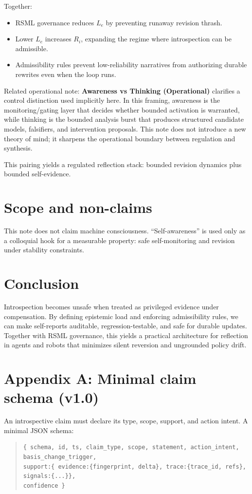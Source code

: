 \documentclass[11pt]{article}
\begin{document}
Together:
\begin{itemize}
  \item RSML governance reduces $L_e$ by preventing runaway revision thrash.
  \item Lower $L_e$ increases $R_i$, expanding the regime where introspection can be admissible.
  \item Admissibility rules prevent low-reliability narratives from authorizing durable rewrites even when the
        loop runs.
\end{itemize}
Related operational note: \textbf{Awareness vs Thinking (Operational)} clarifies a control distinction used
implicitly here. In this framing, awareness is the monitoring/gating layer that decides whether bounded
activation is warranted, while thinking is the bounded analysis burst that produces structured candidate
models, falsifiers, and intervention proposals. This note does not introduce a new theory of mind; it
sharpens the operational boundary between regulation and synthesis.

This pairing yields a regulated reflection stack: bounded revision dynamics plus bounded self-evidence.

\section{Scope and non-claims}
This note does not claim machine consciousness. \enquote{Self-awareness} is used only as a colloquial hook
for a measurable property: safe self-monitoring and revision under stability constraints.

\section{Conclusion}
Introspection becomes unsafe when treated as privileged evidence under compensation. By defining
epistemic load and enforcing admissibility rules, we can make self-reports auditable, regression-testable,
and safe for durable updates. Together with RSML governance, this yields a practical architecture for
reflection in agents and robots that minimizes silent reversion and ungrounded policy drift.

\appendix
\section{Appendix A: Minimal claim schema (v1.0)}
An introspective claim must declare its type, scope, support, and action intent. A minimal JSON schema:
\begin{quote}\small
\texttt{\{ schema, id, ts, claim\_type, scope, statement, action\_intent, basis\_change\_trigger,}\\
\texttt{\quad support:\{ evidence:\{fingerprint, delta\}, trace:\{trace\_id, refs\}, signals:\{...\}\},}\\
\texttt{\quad confidence \}}
\end{quote}
\end{document}
